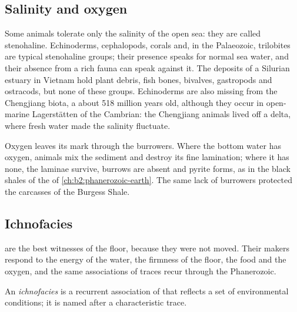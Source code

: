 \subsection*{Salinity and oxygen}

Some animals tolerate only the salinity of the open sea: they are called stenohaline. Echinoderms,
cephalopods, corals and, in the Palaeozoic, trilobites are typical stenohaline groups; their
presence speaks for normal sea water, and their absence from a rich fauna can speak against it.
The deposits of a Silurian estuary in Vietnam hold plant debris, fish bones, bivalves, gastropods
and ostracods, but none of these groups. Echinoderms are also missing from the Chengjiang biota,
a  about 518 million years old, although they occur in open-marine Lagerstätten of the
Cambrian: the Chengjiang animals lived off a delta, where fresh water made the salinity fluctuate.

Oxygen leaves its mark through the burrowers. Where the bottom water has oxygen, animals mix the
sediment and destroy its fine lamination; where it has none, the laminae survive, burrows are
absent and pyrite forms, as in the black shales of the  of
\cref{ch:b2:phanerozoic-earth}. The same lack of burrowers protected the carcasses of the Burgess
Shale.

\subsection*{Ichnofacies}

 are the best witnesses of the floor, because they were not moved. Their makers
respond to the energy of the water, the firmness of the floor, the food and the oxygen, and the
same associations of traces recur through the Phanerozoic.

\begin{definition}[Ichnofacies]\label{def:b2:palaeoenvironments:ichnofacies}
An \emph{ichnofacies} is a recurrent association of  that
reflects a set of environmental conditions; it is named after a characteristic trace.
\end{definition}


